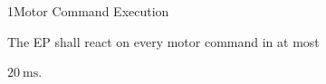 \req
	{1}{Motor Command Execution}
	{

        The EP shall react on every motor command in at most

        $\SI{20}{\milli\second}$.

    }
	{}

